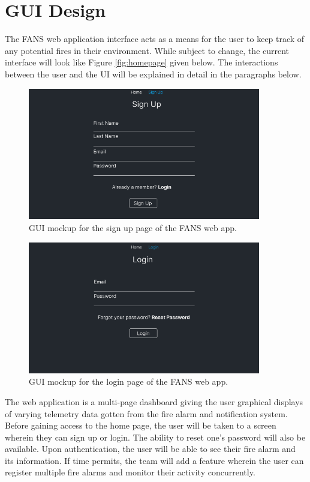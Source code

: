 \section{GUI Design}

The FANS web application interface acts as a means for the user to keep track of any potential fires in their
environment. While subject to change, the current interface will look like Figure \ref{fig:homepage} given below. The
interactions between the user and the UI will be explained in detail in the paragraphs below.

\begin{figure}[H]
    \centering
    \includegraphics[width=4in]{../assets/SignUpPage.png}
    \caption{GUI mockup for the sign up page of the FANS web app.}
    \label{fig:signup}
\end{figure}

\begin{figure}[H]
    \centering
    \includegraphics[width=4in]{../assets/LoginPage.png}
    \caption{GUI mockup for the login page of the FANS web app.}
    \label{fig:login}
\end{figure}

The web application is a multi-page dashboard giving the user graphical displays of varying telemetry data gotten from
the fire alarm and notification system. Before gaining access to the home page, the user will be taken to a screen
wherein they can sign up or login. The ability to reset one's password will also be available. Upon authentication, the
user will be able to see their fire alarm and its information. If time permits, the team will add a feature wherein the
user can register multiple fire alarms and monitor their activity concurrently.

